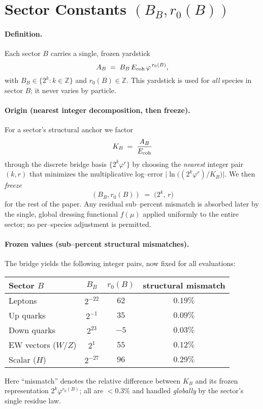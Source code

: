 \documentclass[epjc3]{svjour3}
\begin{document}
\section{Sector Constants $(B_B, r_0(B))$}

\paragraph{Definition.}
Each sector $B$ carries a single, frozen yardstick
\[
A_B \;=\; B_B\,E_{\rm coh}\,\varphi^{\,r_0(B)},
\]
with $B_B\in\{2^k:k\in\mathbb Z\}$ and $r_0(B)\in\mathbb Z$. This yardstick is used for \emph{all} species in sector $B$; it never varies by particle.

\paragraph{Origin (nearest integer decomposition, then freeze).}
For a sector’s structural anchor we factor
\[
K_B \;=\; \frac{A_B}{E_{\rm coh}}
\]
through the discrete bridge basis $\{2^k\varphi^{r}\}$ by choosing the \emph{nearest} integer pair $(k,r)$ that minimizes the multiplicative log–error
$\bigl|\ln\!\bigl((2^k\varphi^{r})/K_B\bigr)\bigr|$. We then \emph{freeze}
\[
(B_B,r_0(B)) \;=\; \bigl(2^k,\,r\bigr)
\]
for the rest of the paper. Any residual sub–percent mismatch is absorbed later by the single, global dressing functional $f(\mu)$ applied uniformly to the entire sector; no per–species adjustment is permitted.

\paragraph{Frozen values (sub–percent structural mismatches).}
The bridge yields the following integer pairs, now fixed for all evaluations:
\begin{center}
\begin{tabular}{lccc}
\hline
Sector $B$ & $B_B$ & $r_0(B)$ & structural mismatch \\
\hline
Leptons        & $2^{-22}$ & $62$ & $0.19\%$ \\
Up quarks      & $2^{-1}$  & $35$ & $0.09\%$ \\
Down quarks    & $2^{23}$  & $-5$ & $0.03\%$ \\
EW vectors ($W/Z$) & $2^{1}$   & $55$ & $0.12\%$ \\
Scalar ($H$)   & $2^{-27}$ & $96$ & $0.29\%$ \\
\hline
\end{tabular}
\end{center}
Here “mismatch” denotes the relative difference between $K_B$ and its frozen representation $2^k\varphi^{r_0(B)}$; all are $<0.3\%$ and handled \emph{globally} by the sector’s single residue law.
\end{document}
